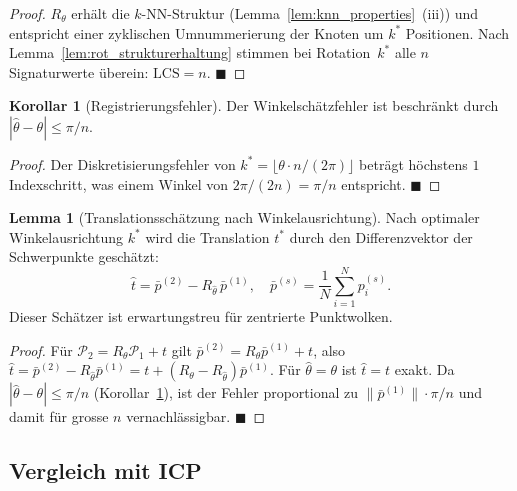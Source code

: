 ﻿\documentclass[a4paper,12pt]{article}
\theoremstyle{definition}
\newtheorem{lemma}{Lemma}[section]
\newtheorem{korollar}{Korollar}[section]
\begin{document}
\begin{proof}
  $R_\theta$ erhält die $k$-NN-Struktur
  (Lemma~\ref{lem:knn_properties}~(iii)) und entspricht einer
  zyklischen Umnummerierung der Knoten um $k^*$ Positionen.
  Nach Lemma~\ref{lem:rot_strukturerhaltung} stimmen bei
  Rotation~$k^*$ alle $n$ Signaturwerte überein:
  $\mathrm{LCS} = n$. \hfill$\blacksquare$
\end{proof}

\begin{korollar}[Registrierungsfehler]
  \label{kor:reg_fehler}
  Der Winkelschätzfehler ist beschränkt durch
  $|\hat\theta - \theta| \leq \pi / n$.
\end{korollar}

\begin{proof}
  Der Diskretisierungsfehler von $k^* = \lfloor \theta \cdot n /
  (2\pi) \rfloor$ beträgt höchstens $1$ Indexschritt, was einem
  Winkel von $2\pi / (2n) = \pi/n$ entspricht. \hfill$\blacksquare$
\end{proof}

\begin{lemma}[Translationsschätzung nach Winkelausrichtung]
  \label{lem:translation}
  Nach optimaler Winkelausrichtung $k^*$ wird die Translation
  $t^*$ durch den Differenzvektor der Schwerpunkte geschätzt:
  \[
    \hat{t} = \bar{p}^{(2)} - R_{\hat\theta}\, \bar{p}^{(1)},
    \quad
    \bar{p}^{(s)} = \frac{1}{N}\sum_{i=1}^N p_i^{(s)}.
  \]
  Dieser Schätzer ist erwartungstreu für zentrierte Punktwolken.
\end{lemma}

\begin{proof}
  Für $\mathcal{P}_2 = R_\theta \mathcal{P}_1 + t$ gilt
  $\bar{p}^{(2)} = R_\theta \bar{p}^{(1)} + t$, also
  $\hat{t} = \bar{p}^{(2)} - R_{\hat\theta} \bar{p}^{(1)}
  = t + (R_\theta - R_{\hat\theta})\bar{p}^{(1)}$.
  Für $\hat\theta = \theta$ ist $\hat{t} = t$ exakt. Da
  $|\hat\theta - \theta| \leq \pi/n$ (Korollar~\ref{kor:reg_fehler}),
  ist der Fehler proportional zu $\|\bar{p}^{(1)}\| \cdot \pi/n$
  und damit für grosse $n$ vernachlässigbar. \hfill$\blacksquare$
\end{proof}

\subsection{Vergleich mit ICP}
\end{document}
